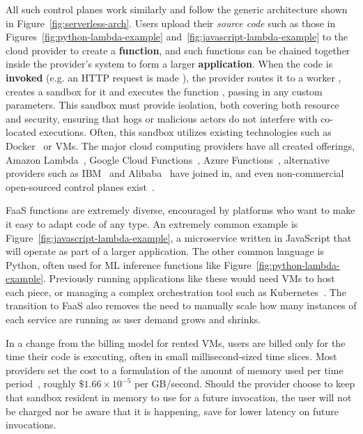 All such control planes work similarly and follow the generic architecture shown in Figure~\ref{fig:serverless-arch}.
Users upload their \textit{source code}  such as those in Figures~\ref{fig:python-lambda-example} and~\ref{fig:javascript-lambda-example} to the cloud provider to create a \textbf{function}, and such functions can be chained together inside the provider's system to form a larger \textbf{application}.
When the code is \textbf{invoked} (e.g. an HTTP request is made ), the provider routes it to a worker , creates a sandbox for it and executes the function , passing in any custom parameters.
This sandbox must provide isolation, both covering both resource and security, ensuring that hogs or malicious actors do not interfere with co-located executions.
Often, this sandbox utilizes existing technologies such as Docker~\cite{docker-main} or VMs.
The major cloud computing providers have all created offerings, Amazon Lambda~\cite{lambda}, Google Cloud Functions~\cite{gcp-functions}, Azure Functions~\cite{azure-functions}, alternative providers such as IBM~\cite{openwhisk} and Alibaba~\cite{alibaba-compute} have joined in, and even non-commercial open-sourced control planes exist~\cite{hendrickson2016serverless,openfaas}.



FaaS functions are extremely diverse, encouraged by platforms who want to make it easy to adapt code of any type.
An extremely common example is Figure~\ref{fig:javascript-lambda-example}, a microservice written in JavaScript that will operate as part of a larger application.
The other common language is Python, often used for ML inference functions like Figure~\ref{fig:python-lambda-example}.
Previously running applications like these would need VMs to host each piece, or managing a complex orchestration tool such as Kubernetes~\cite{kubernetes}.
The transition to FaaS also removes the need to manually scale how many instances of each service are running as user demand grows and shrinks.

In a change from the billing model for rented VMs, users are billed only for the time their code is executing, often in small millisecond-sized time slices.
Most providers set the cost to a formulation of the amount of memory used per time period~\cite{lambda-pricing}, roughly $\$1.66 \times 10^{-5}$ per GB/second.
Should the provider choose to keep that sandbox resident in memory to use for a future invocation, the user will not be charged nor be aware that it is happening, save for lower latency on future invocations.

